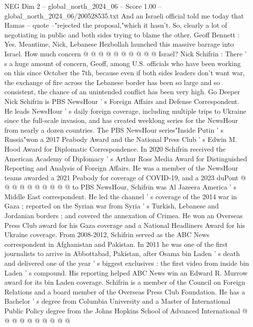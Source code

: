 \begin{textsample}{NEG Dim 2 – global\_north\_2024\_06 – Score 1.00 – global\_north\_2024\_06/200528535.txt}
And an Israeli official told me today that Hamas -- quote --"rejected the proposal,"which it hasn't.
So, clearly a lot of negotiating in public and both sides trying to blame the other.
Geoff Bennett : Yes.
Meantime, Nick, Lebanese Hezbollah launched this massive barrage into Israel.
How much concern @ @ @ @ @ @ @ @ @ @ Israel?
Nick Schifrin : There ' s a huge amount of concern, Geoff, among U.S. officials who have been working on this since October the 7th, because even if both sides leaders don't want war, the exchange of fire across the Lebanese border has been so large and so consistent, the chance of an unintended conflict has been very high.
Go Deeper Nick Schifrin is PBS NewsHour ' s Foreign Affairs and Defense Correspondent.
He leads NewsHour ' s daily foreign coverage, including multiple trips to Ukraine since the full-scale invasion, and has created weeklong series for the NewsHour from nearly a dozen countries.
The PBS NewsHour series"Inside Putin ' s Russia"won a 2017 Peabody Award and the National Press Club ' s Edwin M.
Hood Award for Diplomatic Correspondence.
In 2020 Schifrin received the American Academy of Diplomacy ' s Arthur Ross Media Award for Distinguished Reporting and Analysis of Foreign Affairs.
He was a member of the NewsHour teams awarded a 2021 Peabody for coverage of COVID-19, and a 2023 duPont @ @ @ @ @ @ @ @ @ @ to PBS NewsHour, Schifrin was Al Jazeera America ' s Middle East correspondent.
He led the channel ' s coverage of the 2014 war in Gaza ; reported on the Syrian war from Syria ' s Turkish, Lebanese and Jordanian borders ; and covered the annexation of Crimea.
He won an Overseas Press Club award for his Gaza coverage and a National Headliners Award for his Ukraine coverage.
From 2008-2012, Schifrin served as the ABC News correspondent in Afghanistan and Pakistan.
In 2011 he was one of the first journalists to arrive in Abbottabad, Pakistan, after Osama bin Laden ' s death and delivered one of the year ' s biggest exclusives : the first video from inside bin Laden ' s compound.
His reporting helped ABC News win an Edward R.
Murrow award for its bin Laden coverage.
Schifrin is a member of the Council on Foreign Relations and a board member of the Overseas Press Club Foundation.
He has a Bachelor ' s degree from Columbia University and a Master of International Public Policy degree from the Johns Hopkins School of Advanced International @ @ @ @ @ @ @ @ @ @

\end{textsample}
